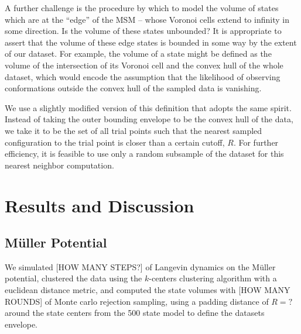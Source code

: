 \documentclass[twocolumn,floatfix,nofootinbib,aps]{revtex4-1}
\begin{document}
A further challenge is the procedure by which to model the volume of states which are at the ``edge'' of the MSM -- whose Voronoi cells extend to infinity in some direction. Is the volume of these states unbounded? It is appropriate to assert that the volume of these edge states is bounded in some way by the extent of our dataset. For example, the volume of a state might be defined as the volume of the intersection of its Voronoi cell and the convex hull of the whole dataset, which would encode the assumption that the likelihood of observing conformations outside the convex hull of the sampled data is vanishing.

We use a slightly modified version of this definition that adopts the same spirit. Instead of taking the outer bounding envelope to be the convex hull of the data, we take it to be the set of all trial points such that the nearest sampled configuration to the trial point is closer than a certain cutoff, $R$. For further efficiency, it is feasible to use only a random subsample of the dataset for this nearest neighbor computation.

\section{Results and Discussion}
\subsection{M\"{u}ller Potential}
We simulated [HOW MANY STEPS?] of Langevin dynamics on the M\"{u}ller potential, clustered the data using the $k$-centers clustering algorithm with a euclidean distance metric, and computed the state volumes with [HOW MANY ROUNDS] of Monte carlo rejection sampling, using a padding distance of $R=?$ around the state centers from the 500 state model to define the datasets envelope.
\end{document}
